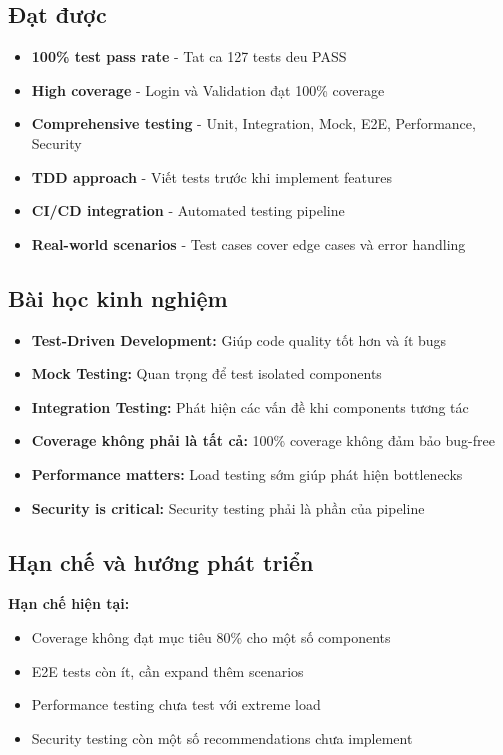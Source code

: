 \subsection{Đạt được}

\begin{itemize}
    \item \textbf{100\% test pass rate} - Tat ca 127 tests deu PASS
    \item \textbf{High coverage} - Login và Validation đạt 100\% coverage
    \item \textbf{Comprehensive testing} - Unit, Integration, Mock, E2E, Performance, Security
    \item \textbf{TDD approach} - Viết tests trước khi implement features
    \item \textbf{CI/CD integration} - Automated testing pipeline
    \item \textbf{Real-world scenarios} - Test cases cover edge cases và error handling
\end{itemize}

\subsection{Bài học kinh nghiệm}

\begin{itemize}
    \item \textbf{Test-Driven Development:} Giúp code quality tốt hơn và ít bugs
    \item \textbf{Mock Testing:} Quan trọng để test isolated components
    \item \textbf{Integration Testing:} Phát hiện các vấn đề khi components tương tác
    \item \textbf{Coverage không phải là tất cả:} 100\% coverage không đảm bảo bug-free
    \item \textbf{Performance matters:} Load testing sớm giúp phát hiện bottlenecks
    \item \textbf{Security is critical:} Security testing phải là phần của pipeline
\end{itemize}

\subsection{Hạn chế và hướng phát triển}

\textbf{Hạn chế hiện tại:}
\begin{itemize}
    \item Coverage không đạt mục tiêu 80\% cho một số components
    \item E2E tests còn ít, cần expand thêm scenarios
    \item Performance testing chưa test với extreme load
    \item Security testing còn một số recommendations chưa implement
\end{itemize}

